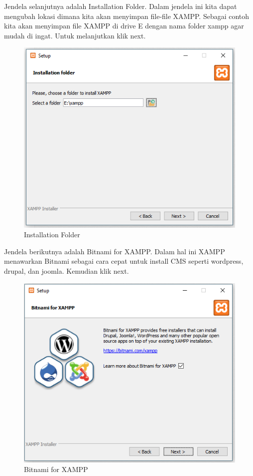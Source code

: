 Jendela selanjutnya adalah Installation Folder. Dalam jendela ini kita dapat mengubah lokasi dimana kita akan menyimpan file-file XAMPP. Sebagai contoh kita akan menyimpan file XAMPP di drive E dengan nama folder xampp agar mudah di ingat. Untuk melanjutkan klik next.

\begin{figure}[h]
\centering
\includegraphics[scale=0.5]{figures/installationfolder}
\caption{Installation Folder}
\end{figure}

Jendela berikutnya adalah Bitnami for XAMPP. Dalam hal ini XAMPP menawarkan Bitnami sebagai cara cepat untuk install CMS seperti wordpress, drupal, dan joomla. Kemudian klik next.

\begin{figure}[h]
\centering
\includegraphics[scale=0.5]{figures/bitnamiforxampp}
\caption{Bitnami for XAMPP}
\end{figure}

